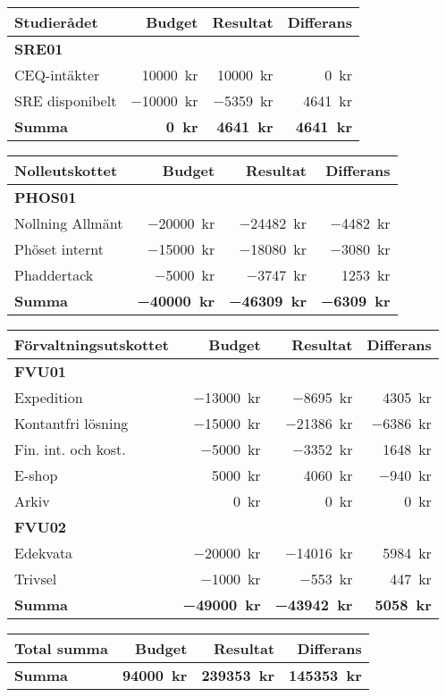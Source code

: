 \documentclass[../_main/handlingar.tex]{subfiles}
\begin{document}
\begin{tabularx}{12cm}{X r r r}
    \textbf{\large Studierådet} & \textbf{Budget} & \textbf{Resultat} & \textbf{Differans} \\
    \hline
    \textbf{SRE01} \\
    CEQ-intäkter & \SI{10000}{kr} & \SI{10000}{kr} & \SI{0}{kr} \\
    SRE disponibelt & \SI{-10000}{kr} & \SI{-5359}{kr} & \SI{4641}{kr} \\
    \hline
    \textbf{Summa} & \textbf{\SI{0}{kr}} & \textbf{\SI{4641}{kr}} & \textbf{\SI{4641}{kr}} \\
\end{tabularx}

\begin{tabularx}{12cm}{X r r r}
    \textbf{\large Nolleutskottet} & \textbf{Budget} & \textbf{Resultat} & \textbf{Differans} \\
    \hline
    \textbf{PHOS01} \\
    Nollning Allmänt & \SI{-20000}{kr} & \SI{-24482}{kr} & \SI{-4482}{kr} \\
    Phöset internt & \SI{-15000}{kr} & \SI{-18080}{kr} & \SI{-3080}{kr} \\
    Phaddertack & \SI{-5000}{kr} & \SI{-3747}{kr} & \SI{1253}{kr} \\
    \hline
    \textbf{Summa} & \textbf{\SI{-40000}{kr}} & \textbf{\SI{-46309}{kr}} & \textbf{\SI{-6309}{kr}} \\
\end{tabularx}

\begin{tabularx}{12cm}{X r r r}
    \textbf{\large Förvaltningsutskottet} & \textbf{Budget} & \textbf{Resultat} & \textbf{Differans} \\
    \hline
    \textbf{FVU01} \\
    Expedition & \SI{-13000}{kr} & \SI{-8695}{kr} & \SI{4305}{kr} \\
    Kontantfri lösning & \SI{-15000}{kr} & \SI{-21386}{kr} & \SI{-6386}{kr} \\
    Fin. int. och kost. & \SI{-5000}{kr} & \SI{-3352}{kr} & \SI{1648}{kr} \\
    E-shop & \SI{5000}{kr} & \SI{4060}{kr} & \SI{-940}{kr} \\
    Arkiv & \SI{0}{kr} & \SI{0}{kr} & \SI{0}{kr} \\
    \textbf{FVU02} \\
    Edekvata & \SI{-20000}{kr} & \SI{-14016}{kr} & \SI{5984}{kr} \\
    Trivsel & \SI{-1000}{kr} & \SI{-553}{kr} & \SI{447}{kr} \\
    \hline
    \textbf{Summa} & \textbf{\SI{-49000}{kr}} & \textbf{\SI{-43942}{kr}} & \textbf{\SI{5058}{kr}} \\
\end{tabularx}

\begin{tabularx}{12cm}{X r r r}
    \textbf{\large Total summa} & \textbf{Budget} & \textbf{Resultat} & \textbf{Differans} \\
    \hline
    \textbf{Summa} & \textbf{\SI{94000}{kr}} & \textbf{\SI{239353}{kr}} & \textbf{\SI{145353}{kr}} \\
\end{tabularx}

\newpage
\end{document}
